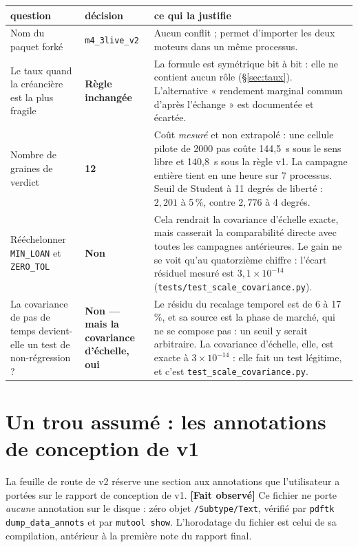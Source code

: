 \documentclass[11pt,a4paper]{article}
\newcommand{\code}[1]{\texttt{#1}}
\newcommand{\fait}{\textbf{[Fait observé]}}
\begin{document}
\begin{center}\footnotesize
\begin{tabular}{@{}p{3.5cm}p{4.2cm}p{6.0cm}@{}}
\toprule
\textbf{question} & \textbf{décision} & \textbf{ce qui la justifie} \\
\midrule
Nom du paquet forké &
\code{m4\_3live\_v2} &
Aucun conflit ; permet d'importer les deux moteurs dans un même processus. \\
\addlinespace
Le taux quand la créancière est la plus fragile &
\textbf{Règle inchangée} &
La formule est symétrique bit à bit : elle ne contient aucun rôle
(§\ref{sec:taux}). L'alternative « rendement marginal commun d'après
l'échange » est documentée et écartée. \\
\addlinespace
Nombre de graines de verdict &
\textbf{12} &
Coût \emph{mesuré} et non extrapolé : une cellule pilote de 2000 pas coûte
144,5~s sous le sens libre et 140,8~s sous la règle v1. La campagne
entière tient en une heure sur 7 processus. Seuil de Student à 11 degrés de
liberté : $2{,}201$ à 5\,\%, contre $2{,}776$ à 4 degrés. \\
\addlinespace
Rééchelonner \code{MIN\_LOAN} et \code{ZERO\_TOL} &
\textbf{Non} &
Cela rendrait la covariance d'échelle exacte, mais casserait la comparabilité
directe avec toutes les campagnes antérieures. Le gain ne se voit qu'au
quatorzième chiffre : l'écart résiduel mesuré est $3{,}1\times10^{-14}$
(\code{tests/test\_scale\_covariance.py}). \\
\addlinespace
La covariance de pas de temps devient-elle un test de non-régression ? &
\textbf{Non --- mais la covariance d'échelle, oui} &
Le résidu du recalage temporel est de 6 à 17\,\%, et sa source est la
phase de marché, qui ne se compose pas : un seuil y serait arbitraire. La
covariance d'échelle, elle, est exacte à $3\times10^{-14}$ : elle fait un test
légitime, et c'est \code{test\_scale\_covariance.py}. \\
\bottomrule
\end{tabular}
\end{center}

\section{Un trou assumé : les annotations de conception de v1}

La feuille de route de v2 réserve une section aux annotations que
l'utilisateur a portées sur le rapport de conception de v1. \fait{} Ce fichier
ne porte \emph{aucune} annotation sur le disque : zéro objet
\code{/Subtype/Text}, vérifié par \code{pdftk dump\_data\_annots} et par
\code{mutool show}. L'horodatage du fichier est celui de sa compilation,
antérieur à la première note du rapport final.
\end{document}
